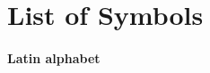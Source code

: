 














\newcommand\mytab{\tab \hspace{-5cm}}




\chapter*{List of Symbols} 
\subsubsection*{Latin alphabet}

